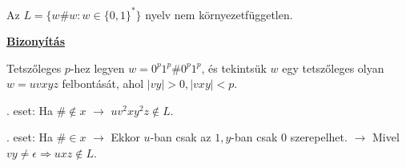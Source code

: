 \documentclass[10pt]{article}
\renewcommand{\\}{\par\noindent}
\begin{document}
\begin{frame}
\begin{tcolorbox}[title={Tétel: Példa nem környezetfüggetlen nyelvre 2}]
Az $L = \{w\#w : w \in \{0, 1\}^* \}$ nyelv nem környezetfüggetlen.\\
\tcblower
\smallskip
\underline{\textbf{Bizonyítás}}\\
\medskip
\\
Tetszőleges $p$-hez legyen $w = 0^p1^p\#0^p1^p$, és tekintsük $w$ egy tetszőleges olyan $w = uvxyz$ felbontását, ahol $|vy| > 0, |vxy| < p$.\\
. eset: Ha $\# \notin x$ $\rightarrow$ $uv^2xy^2z \notin L$.\\
. eset: Ha $\# \in x$ $\rightarrow$ Ekkor $u$-ban csak az $1, y$-ban csak $0$ szerepelhet. $\rightarrow$ Mivel $vy \neq \epsilon \Rightarrow uxz \notin L$.
\end{tcolorbox}
\end{frame}
\end{document}
